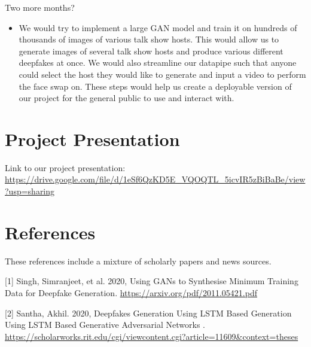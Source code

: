 \documentclass{article}
\begin{document}
Two more months?
\begin{itemize}
  \item We would try to implement a large GAN model and train it on hundreds of thousands of images of various talk show hosts. This would allow us to generate images of several talk show hosts and produce various different deepfakes at once. We would also streamline our datapipe such that anyone could select the host they would like to generate and input a video to perform the face swap on. These steps would help us create a deployable version of our project for the general public to use and interact with. 

\end{itemize}

\section{Project Presentation}
Link to our project presentation:
\url{https://drive.google.com/file/d/1eSf6QzKD5E_VQOQTL_5icvIR5zBiBaBe/view?usp=sharing} 

\section*{References}

These references include a mixture of scholarly papers and news sources.
\medskip

\small
[1] Singh, Simranjeet, et al. 2020, Using GANs to Synthesise Minimum Training Data for Deepfake Generation. \url{https://arxiv.org/pdf/2011.05421.pdf}

[2] Santha, Akhil. 2020, Deepfakes Generation Using LSTM Based Generation Using LSTM Based Generative Adversarial Networks . \url{https://scholarworks.rit.edu/cgi/viewcontent.cgi?article=11609&context=theses}
\end{document}
